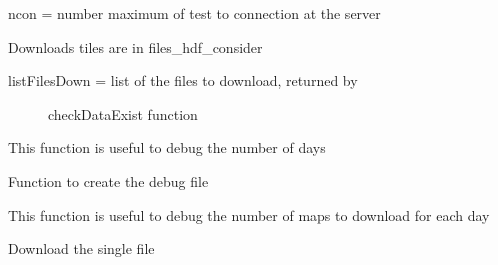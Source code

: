 \documentclass[a4paper,11pt,oneside]{sphinxmanual}
\begin{document}
\begin{fulllineitems}
\begin{fulllineitems}
ncon = number maximum of test to connection at the server

\end{fulllineitems}


\begin{fulllineitems}
\label{pymodis/pymodis:pymodis.downmodis.downModis.dayDownload}
Downloads tiles are in files\_hdf\_consider
\begin{description}
\item[{listFilesDown = list of the files to download, returned by}] \leavevmode
checkDataExist function

\end{description}

\end{fulllineitems}


\begin{fulllineitems}
\label{pymodis/pymodis:pymodis.downmodis.downModis.debugDays}
This function is useful to debug the number of days

\end{fulllineitems}


\begin{fulllineitems}
\label{pymodis/pymodis:pymodis.downmodis.downModis.debugLog}
Function to create the debug file

\end{fulllineitems}


\begin{fulllineitems}
\label{pymodis/pymodis:pymodis.downmodis.downModis.debugMaps}
This function is useful to debug the number of maps to download for
each day

\end{fulllineitems}


\begin{fulllineitems}
\label{pymodis/pymodis:pymodis.downmodis.downModis.downloadFile}
Download the single file


\end{fulllineitems}
\end{fulllineitems}
\end{document}
